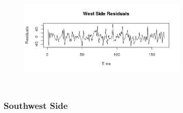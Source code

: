 \documentclass{article} %
\begin{document}
\begin{center}
\begin{figure}[H]
\includegraphics[height=50mm, width=80mm]{Plots/west_resids.png}
\end{figure}
\end{center}
 

 
\subsubsection{Southwest Side}
 
\end{document}
